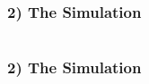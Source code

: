 \documentclass{beamer}
\begin{document}
\begin{frame}
	\frametitle{2) The Simulation}

	\begin{columns}
		\begin{column}{0.3\textwidth}
			\centering
			
		\end{column}

		\begin{column}{0.7\textwidth}
			\centering

		\end{column}
	\end{columns}	
\end{frame}

\begin{frame}
	\frametitle{2) The Simulation}

	
\end{frame}
\end{document}
